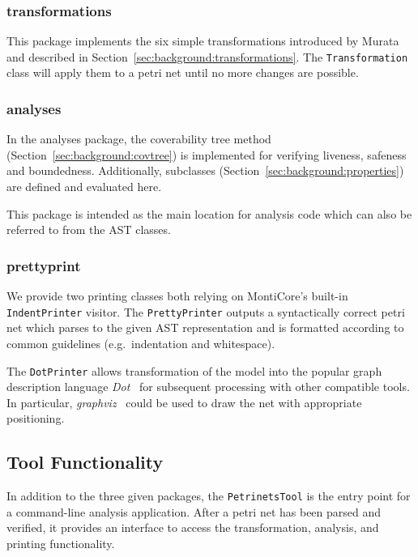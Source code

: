 \subsubsection{transformations}

This package implements the six simple transformations introduced by Murata~\cite{murata1989petri} and described in Section~\ref{sec:background:transformations}. The \texttt{Transformation} class will apply them to a petri net until no more changes are possible.

\subsubsection{analyses}

In the analyses package, the coverability tree method (Section~\ref{sec:background:covtree}) is implemented for verifying liveness, safeness and boundedness. Additionally, subclasses (Section~\ref{sec:background:properties}) are defined and evaluated here.

This package is intended as the main location for analysis code which can also be referred to from the AST classes.

\subsubsection{prettyprint}

We provide two printing classes both relying on MontiCore's built-in \texttt{IndentPrinter} visitor. The \texttt{PrettyPrinter} outputs a syntactically correct petri net which parses to the given AST representation and is formatted according to common guidelines (e.g.\ indentation and whitespace). 

The \texttt{DotPrinter} allows transformation of the model into the popular graph description language \emph{Dot}~\cite{gansner2000open} for subsequent processing with other compatible tools. In particular, \emph{graphviz}~\cite{gansner2000open} could be used to draw the net with appropriate positioning.

\subsection{Tool Functionality}

In addition to the three given packages, the \texttt{PetrinetsTool} is the entry point for a command-line analysis application. After a petri net has been parsed and verified, it provides an interface to access the transformation, analysis, and printing functionality.

